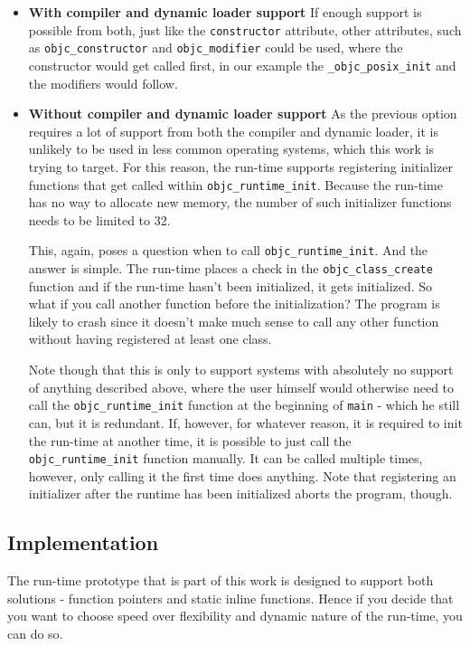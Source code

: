 \begin{itemize}
  \item{\bf{With compiler and dynamic loader support}} If enough support is possible from both, just like the \verb=constructor= attribute, other attributes, such as \verb=objc_constructor= and \verb=objc_modifier= could be used, where the constructor would get called first, in our example the \verb=_objc_posix_init= and the modifiers would follow.
  \item{\bf{Without compiler and dynamic loader support}} As the previous option requires a lot of support from both the compiler and dynamic loader, it is unlikely to be used in less common operating systems, which this work is trying to target. For this reason, the run-time supports registering initializer functions that get called within \verb=objc_runtime_init=. Because the run-time has no way to allocate new memory, the number of such initializer functions needs to be limited to 32.
  
  This, again, poses a question when to call \verb=objc_runtime_init=. And the answer is simple. The run-time places a check in the \verb=objc_class_create= function and if the run-time hasn't been initialized, it gets initialized. So what if you call another function before the initialization? The program is likely to crash since it doesn't make much sense to call any other function without having registered at least one class.
  
  Note though that this is only to support systems with absolutely no support of anything described above, where the user himself would otherwise need to call the \verb=objc_runtime_init= function at the beginning of \verb=main= - which he still can, but it is redundant. If, however, for whatever reason, it is required to init the run-time at another time, it is possible to just call the \verb=objc_runtime_init= function manually. It can be called multiple times, however, only calling it the first time does anything. Note that registering an initializer after the runtime has been initialized aborts the program, though.
\end{itemize}

\subsection{Implementation}

The run-time prototype that is part of this work is designed to support both solutions - function pointers and static inline functions. Hence if you decide that you want to choose speed over flexibility and dynamic nature of the run-time, you can do so.

